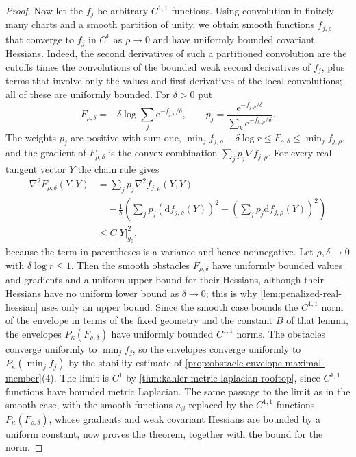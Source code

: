 \begin{proof}
Now let the $f_j$ be arbitrary $C^{1,1}$ functions. Using convolution in finitely many charts and a smooth partition of unity, we obtain smooth functions $f_{j,\rho}$ that converge to $f_j$ in $C^1$ as $\rho\to0$ and have uniformly bounded covariant Hessians. Indeed, the second derivatives of such a partitioned convolution are the cutoffs times the convolutions of the bounded weak second derivatives of $f_j$, plus terms that involve only the values and first derivatives of the local convolutions; all of these are uniformly bounded. For $\delta>0$ put
\[
 F_{\rho,\delta}=-\delta\log\sum_j
                               \mathrm e^{-f_{j,\rho}/\delta},
 \qquad
 p_j=\frac{\mathrm e^{-f_{j,\rho}/\delta}}
          {\sum_k\mathrm e^{-f_{k,\rho}/\delta}}.
\]
The weights $p_j$ are positive with sum one, $\min_jf_{j,\rho}-\delta\log r\leq F_{\rho,\delta}\leq\min_jf_{j,\rho}$, and the gradient of $F_{\rho,\delta}$ is the convex combination $\sum_jp_j\nabla f_{j,\rho}$. For every real tangent vector $Y$ the chain rule gives
\begin{align*}
 \nabla^2F_{\rho,\delta}(Y,Y)
 & =\sum_jp_j\nabla^2f_{j,\rho}(Y,Y)\\
 &\quad-\frac1\delta\left(\sum_jp_j(\mathrm df_{j,\rho}(Y))^2
                         -\left(\sum_jp_j\mathrm df_{j,\rho}(Y)\right)^2\right)\\
 &\leq C|Y|_{g_0}^2,
\end{align*}
because the term in parentheses is a variance and hence nonnegative. Let $\rho,\delta\to0$ with $\delta\log r\leq1$. Then the smooth obstacles $F_{\rho,\delta}$ have uniformly bounded values and gradients and a uniform upper bound for their Hessians, although their Hessians have no uniform lower bound as $\delta\to0$; this is why \cref{lem:penalized-real-hessian} uses only an upper bound. Since the smooth case bounds the $C^{1,1}$ norm of the envelope in terms of the fixed geometry and the constant $B$ of that lemma, the envelopes $P_\kappa(F_{\rho,\delta})$ have uniformly bounded $C^{1,1}$ norms. The obstacles converge uniformly to $\min_jf_j$, so the envelopes converge uniformly to $P_\kappa(\min_jf_j)$ by the stability estimate of \cref{prop:obstacle-envelope-maximal-member}(4). The limit is $C^1$ by \cref{thm:kahler-metric-laplacian-rooftop}, since $C^{1,1}$ functions have bounded metric Laplacian. The same passage to the limit as in the smooth case, with the smooth functions $a_\beta$ replaced by the $C^{1,1}$ functions $P_\kappa(F_{\rho,\delta})$, whose gradients and weak covariant Hessians are bounded by a uniform constant, now proves the theorem, together with the bound for the norm.
\end{proof}
